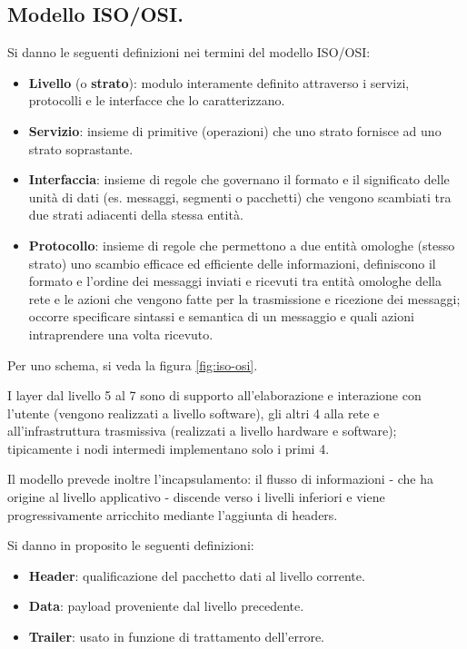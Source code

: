 \documentclass[11pt, italian, openany]{book}
\begin{document}
\begin{sloppypar}
\subsection{Modello ISO/OSI.}
Si danno le seguenti definizioni nei termini del modello ISO/OSI:
\begin{itemize}[topsep=0pt, itemsep=0pt, parsep=0pt]
	\item \textbf{Livello} (o \textbf{strato}): modulo interamente definito attraverso i servizi, protocolli e le interfacce che lo caratterizzano.
	\item \textbf{Servizio}: insieme di primitive (operazioni) che uno strato fornisce ad uno strato soprastante.
	\item \textbf{Interfaccia}: insieme di regole che governano il formato e il significato delle unit\`a di dati (es. messaggi, segmenti o
	pacchetti) che vengono scambiati tra due strati adiacenti della stessa entit\`a.
	\item \textbf{Protocollo}: insieme di regole che permettono a due entit\`a omologhe (stesso strato) uno scambio efficace ed efficiente delle
	informazioni, definiscono il formato e l’ordine dei messaggi inviati e ricevuti tra entit\`a omologhe della rete e le azioni che vengono
	fatte per la trasmissione e ricezione dei messaggi; occorre specificare sintassi e semantica di un messaggio e quali azioni intraprendere
	una volta ricevuto.
\end{itemize}

Per uno schema, si veda la figura \ref{fig:iso-osi}.

I layer dal livello 5 al 7 sono di supporto all'elaborazione e interazione con l'utente (vengono realizzati a livello software), gli altri 4
alla rete e all'infrastruttura trasmissiva (realizzati a livello hardware e software); tipicamente i nodi intermedi implementano solo i primi
4.

Il modello prevede inoltre l'incapsulamento: il flusso di informazioni - che ha origine al livello applicativo - discende verso i livelli inferiori e
viene progressivamente arricchito mediante l'aggiunta di headers.

Si danno in proposito le seguenti definizioni:
\begin{itemize}[topsep=0pt, itemsep=0pt, parsep=0pt]
	\item \textbf{Header}: qualificazione del pacchetto dati al livello corrente.
	\item \textbf{Data}: payload proveniente dal livello precedente.
	\item \textbf{Trailer}: usato in funzione di trattamento dell'errore.
\end{itemize}


\end{sloppypar}
\end{document}
